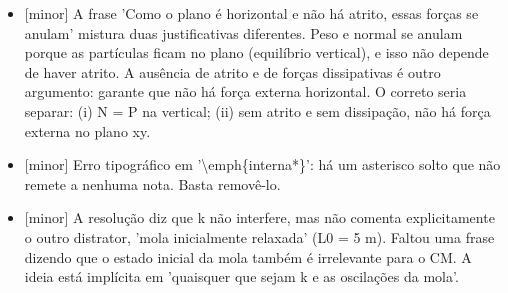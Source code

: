 \documentclass{article}%
\begin{document}
\begin{itemize}%
\item%
{[}minor{]} A frase 'Como o plano é horizontal e não há atrito, essas forças se anulam' mistura duas justificativas diferentes. Peso e normal se anulam porque as partículas ficam no plano (equilíbrio vertical), e isso não depende de haver atrito. A ausência de atrito e de forças dissipativas é outro argumento: garante que não há força externa horizontal. O correto seria separar: (i) N = P na vertical; (ii) sem atrito e sem dissipação, não há força externa no plano xy.%
\item%
{[}minor{]} Erro tipográfico em '\textbackslash{}emph\{interna*\}': há um asterisco solto que não remete a nenhuma nota. Basta removê{-}lo.%
\item%
{[}minor{]} A resolução diz que k não interfere, mas não comenta explicitamente o outro distrator, 'mola inicialmente relaxada' (L0 = 5 m). Faltou uma frase dizendo que o estado inicial da mola também é irrelevante para o CM. A ideia está implícita em 'quaisquer que sejam k e as oscilações da mola'.%
\end{itemize}%
\end{document}
